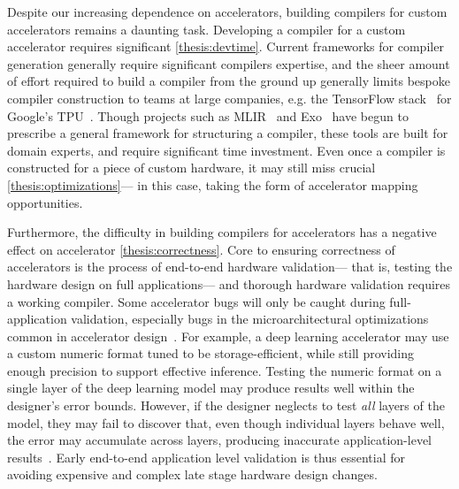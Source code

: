 Despite our increasing dependence
  on accelerators,
  building compilers
  for custom accelerators
  remains a daunting task.
Developing a compiler
  for a custom accelerator
  requires significant
  \cref{thesis:devtime}.
Current frameworks for compiler generation
  generally require significant compilers expertise,
  and the sheer amount of effort
  required to build a compiler from the ground up
  generally limits bespoke compiler construction
  to teams
  at large companies,
  e.g. the TensorFlow 
  stack~\cite{abadi2016tensorflow}
  for Google's 
  TPU~\cite{jouppi2017tpu,jouppi2020tpu}.
Though projects
  such as 
  MLIR~\cite{mlir,
  lattner2021mlir,
  eldridge2021mlir}
  and
  Exo~\cite{ExoPldi22}
  have begun to prescribe
  a general framework
  for structuring a compiler,
  these tools are built for
  domain experts,
  and require significant time investment.
Even once a compiler
  is constructed
  for a piece of custom hardware,
  it may still miss crucial
  \cref{thesis:optimizations}---%
  in this case, taking the form of
  accelerator mapping opportunities.

Furthermore, the difficulty in building compilers
  for accelerators
  has a negative effect
  on accelerator 
  \cref{thesis:correctness}.
Core to ensuring correctness of
  accelerators
  is the process of end-to-end
  hardware \gls{validation}---%
  that is, testing the hardware design
  on full applications---%
  and thorough hardware validation
  requires a working compiler.
Some accelerator bugs 
  will only be caught
  during
  full-application validation,
  especially bugs in the
  microarchitectural optimizations common in accelerator design~\cite{chan2014itrs,fang2019understanding,lai2021programming}.
For example,
  a deep learning
  accelerator may use
  a custom numeric format
  tuned to be storage-efficient,
  while still providing enough
  precision
  to support effective inference.
Testing the numeric format
  on a single layer
  of the deep learning model
  may produce results
  well within the designer's
  error bounds.
However, if the designer
  neglects to test
  \textit{all}
  layers of the model,
  they may fail to discover that,
  even though individual layers
  behave well,
  the error may accumulate
  across layers,
  producing inaccurate application-level results~\cite{zorn2021rounding}.
Early end-to-end application level validation is thus essential
  for avoiding expensive and complex late stage hardware design changes.

